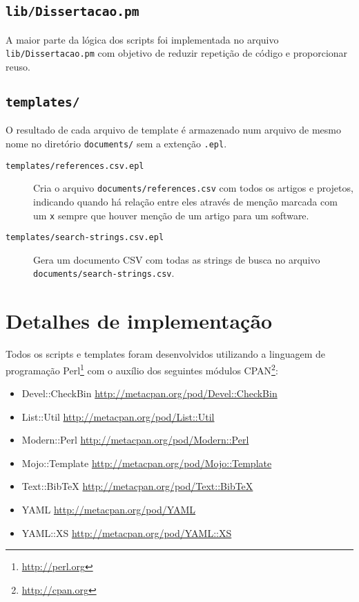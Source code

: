 \subsection{\texttt{lib/Dissertacao.pm}}

A maior parte da lógica dos scripts foi implementada no arquivo
\texttt{lib/Dissertacao.pm} com objetivo de reduzir repetição de código e
proporcionar reuso.

\subsection{\texttt{templates/}}

O resultado de cada arquivo de template é armazenado num arquivo de mesmo nome
no diretório \texttt{documents/} sem a extenção \texttt{.epl}.

\begin{description}

  \item [\texttt{templates/references.csv.epl}]
    Cria o arquivo \texttt{documents/references.csv} com todos os artigos e
    projetos, indicando quando há relação entre eles através de menção marcada
    com um \texttt{x} sempre que houver menção de um artigo para um software.

  \item [\texttt{templates/search-strings.csv.epl}]
    Gera um documento CSV com todas as strings de busca no arquivo
    \texttt{documents/search-strings.csv}.


\end{description}

\section{Detalhes de implementação}


Todos os scripts e templates foram desenvolvidos utilizando a linguagem de
programação Perl\footnote{\url{http://perl.org}} com o auxílio dos seguintes
módulos CPAN\footnote{\url{http://cpan.org}}:

\begin{itemize}
  \item Devel::CheckBin \url{http://metacpan.org/pod/Devel::CheckBin}
  \item List::Util \url{http://metacpan.org/pod/List::Util}
  \item Modern::Perl \url{http://metacpan.org/pod/Modern::Perl}
  \item Mojo::Template \url{http://metacpan.org/pod/Mojo::Template}
  \item Text::BibTeX \url{http://metacpan.org/pod/Text::BibTeX}
  \item YAML \url{http://metacpan.org/pod/YAML}
  \item YAML::XS \url{http://metacpan.org/pod/YAML::XS}
\end{itemize}

